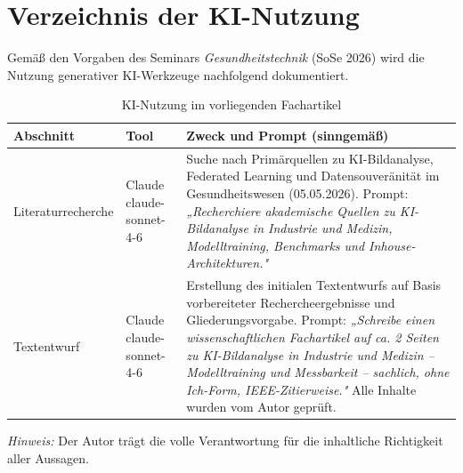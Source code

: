 \section*{Verzeichnis der KI-Nutzung}
\thispagestyle{plain}

Gemäß den Vorgaben des Seminars \textit{Gesundheitstechnik} (SoSe 2026) wird die Nutzung
generativer KI-Werkzeuge nachfolgend dokumentiert.

\begin{table}[htbp]
    \centering
    \caption{KI-Nutzung im vorliegenden Fachartikel}
    \label{tab:ki_nutzung}
    \begin{tabularx}{\textwidth}{|l|l|X|}
        \hline
        \textbf{Abschnitt} & \textbf{Tool} & \textbf{Zweck und Prompt (sinngemäß)} \\
        \hline
        Literaturrecherche &
        Claude claude-sonnet-4-6 &
        Suche nach Primärquellen zu KI-Bildanalyse, Federated Learning und
        Datensouveränität im Gesundheitswesen (05.05.2026). Prompt: \textit{„Recherchiere
        akademische Quellen zu KI-Bildanalyse in Industrie und Medizin, Modelltraining,
        Benchmarks und Inhouse-Architekturen."} \\
        \hline
        Textentwurf &
        Claude claude-sonnet-4-6 &
        Erstellung des initialen Textentwurfs auf Basis vorbereiteter
        Rechercheergebnisse und Gliederungsvorgabe. Prompt: \textit{„Schreibe einen
        wissenschaftlichen Fachartikel auf ca. 2 Seiten zu KI-Bildanalyse in Industrie
        und Medizin -- Modelltraining und Messbarkeit -- sachlich, ohne Ich-Form,
        IEEE-Zitierweise."} Alle Inhalte wurden vom Autor geprüft. \\
        \hline
    \end{tabularx}
\end{table}

\textit{Hinweis:} Der Autor trägt die volle Verantwortung für die inhaltliche Richtigkeit
aller Aussagen.
